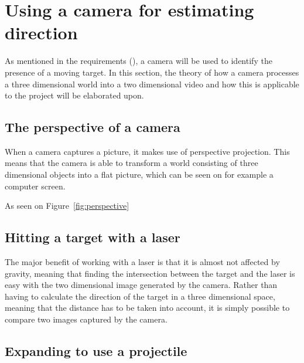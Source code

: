 \section{Using a camera for estimating direction}
As mentioned in the requirements (\label{subsec:requirements}), a camera will be used to identify the presence of a moving target.
In this section, the theory of how a camera processes a three dimensional world into a two dimensional video and how this is applicable to the project will be elaborated upon.

\subsection{The perspective of a camera}
When a camera captures a picture, it makes use of perspective projection.
This means that the camera is able to transform a world consisting of three dimensional objects into a flat picture, which can be seen on for example a computer screen.


As seen on Figure~\ref{fig:perspective} 


\subsection{Hitting a target with a laser}
The major benefit of working with a laser is that it is almost not affected by gravity, meaning that finding the intersection between the target and the laser is easy with the two dimensional image generated by the camera.
Rather than having to calculate the direction of the target in a three dimensional space, meaning that the distance has to be taken into account, it is simply possible to compare two images captured by the camera.


%

\subsection{Expanding to use a projectile}

